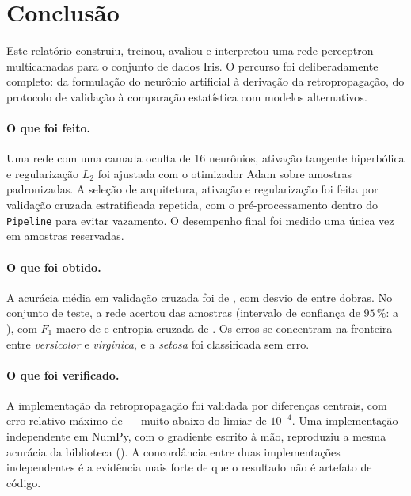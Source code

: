 \section{Conclusão}
\label{sec:conclusao}

Este relatório construiu, treinou, avaliou e interpretou uma rede perceptron multicamadas para o
conjunto de dados Iris. O percurso foi deliberadamente completo: da formulação do neurônio
artificial à derivação da retropropagação, do protocolo de validação à comparação estatística com
modelos alternativos.

\paragraph{O que foi feito.} Uma rede com uma camada oculta de 16 neurônios, ativação tangente
hiperbólica e regularização $L_2$ foi ajustada com o otimizador Adam sobre \nTreino{} amostras
padronizadas. A seleção de arquitetura, ativação e regularização foi feita por validação cruzada
estratificada repetida, com o pré-processamento dentro do \texttt{Pipeline} para evitar vazamento.
O desempenho final foi medido uma única vez em \nTeste{} amostras reservadas.

\paragraph{O que foi obtido.} A acurácia média em validação cruzada foi de \accMLP{}, com desvio de
\sdMLP{} entre dobras. No conjunto de teste, a rede acertou \accTeste{} das amostras (intervalo de
confiança de $95\,\%$: \icLo{} a \icHi{}), com $F_1$ macro de \fmacroTeste{} e entropia cruzada de
\llteste{}. Os erros se concentram na fronteira entre \emph{versicolor} e \emph{virginica}, e a
\emph{setosa} foi classificada sem erro.

\paragraph{O que foi verificado.} A implementação da retropropagação foi validada por diferenças
centrais, com erro relativo máximo de \erroGrad{} --- muito abaixo do limiar de $10^{-4}$. Uma
implementação independente em NumPy, com o gradiente escrito à mão, reproduziu a mesma acurácia da
biblioteca (\accNumpy{}). A concordância entre duas implementações independentes é a evidência
mais forte de que o resultado não é artefato de código.

